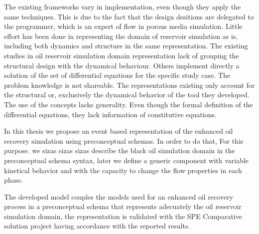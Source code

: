 The existing frameworks vary in implementation, even though they apply the same techniques. This is due to the fact that the design desitions are delegated to the programmer, which is an expert of flow in porous media simulation. Little effort has been done in representing the domain of reservoir simulation as is, including both dynamics and structure in the same representation. The existing studies in oil reservoir simulation domain representation lack of grouping the structural design with the dynamical behaviour. Others implement directly a solution of the set of differential equations for the specific study case. The problem knowledge is not shareable. The representations existing only account for the structural or, exclusively the dynamical behavior of the tool they developed. The use of the concepts lacks generality. Even though the formal definition of the differential equations, they lack information of constitutive equations. 

In this thesis we propose an event based representation of the enhanced oil recovery simulation using preconceptual schemas. In order to do that, For this purpose. we sizas sizas sizas describe the black oil simulation domain in the preconceptual schema syntax, later we define a generic component with variable kinetical behavior and with the capacity to change the flow properties in each phase.

The developed model couples the models used for an enhanced oil recovery process in a preconceptual schema that represents adecuately the oil reservoir simulation domain, the representation is validated with the SPE Comparative solution project having accordance with the reported results.